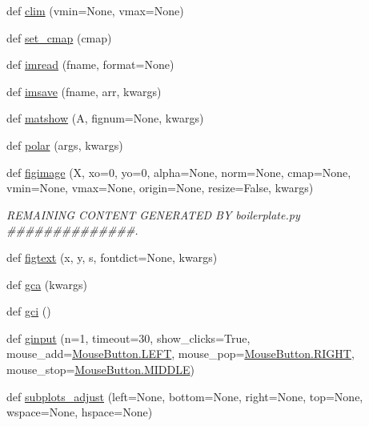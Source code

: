 \begin{DoxyCompactItemize}
def \hyperlink{namespacematplotlib_1_1pyplot_a413472148a3c1f5a2665920f297d1ff5}{clim} (vmin=None, vmax=None)
\item 
def \hyperlink{namespacematplotlib_1_1pyplot_a804514d96fdf423c2bbcb435bab08bd4}{set\+\_\+cmap} (cmap)
\item 
def \hyperlink{namespacematplotlib_1_1pyplot_a7deadbf80afd785a9ef5b2128e292541}{imread} (fname, format=None)
\item 
def \hyperlink{namespacematplotlib_1_1pyplot_abdaa34f18b9c0dbfc8fe5fc205f534cb}{imsave} (fname, arr, kwargs)
\item 
def \hyperlink{namespacematplotlib_1_1pyplot_a96bbaba88a450c5cc69c5585d0de5ae6}{matshow} (A, fignum=None, kwargs)
\item 
def \hyperlink{namespacematplotlib_1_1pyplot_a61f89e91655ed628a676ff105a030142}{polar} (args, kwargs)
\item 
def \hyperlink{namespacematplotlib_1_1pyplot_ac063c7afc5dc35f98c550f42f90da996}{figimage} (X, xo=0, yo=0, alpha=None, norm=None, cmap=None, vmin=None, vmax=None, origin=None, resize=False, kwargs)
\begin{DoxyCompactList}\small\item\em R\+E\+M\+A\+I\+N\+I\+NG C\+O\+N\+T\+E\+NT G\+E\+N\+E\+R\+A\+T\+ED BY boilerplate.\+py \#\#\#\#\#\#\#\#\#\#\#\#\#\#. \end{DoxyCompactList}\item 
def \hyperlink{namespacematplotlib_1_1pyplot_a868f2a8d6e864b41f32a29be3c19ce1e}{figtext} (x, y, s, fontdict=None, kwargs)
\item 
def \hyperlink{namespacematplotlib_1_1pyplot_a5caf006dd7ad1b34c5b806459a2ed19e}{gca} (kwargs)
\item 
def \hyperlink{namespacematplotlib_1_1pyplot_a07302c3a1b7a35a9a5e46c48b92d9012}{gci} ()
\item 
def \hyperlink{namespacematplotlib_1_1pyplot_a71d7a13e292f554fbed54305ab7495c7}{ginput} (n=1, timeout=30, show\+\_\+clicks=True, mouse\+\_\+add=\hyperlink{classmatplotlib_1_1backend__bases_1_1MouseButton_ae8e233d820706cbadfe957ae465eeb95}{Mouse\+Button.\+L\+E\+FT}, mouse\+\_\+pop=\hyperlink{classmatplotlib_1_1backend__bases_1_1MouseButton_a978a5d3296f60f59521a4e671cada7c8}{Mouse\+Button.\+R\+I\+G\+HT}, mouse\+\_\+stop=\hyperlink{classmatplotlib_1_1backend__bases_1_1MouseButton_ae501ff34ab8b37895cebc5046cc651a7}{Mouse\+Button.\+M\+I\+D\+D\+LE})
\item 
def \hyperlink{namespacematplotlib_1_1pyplot_a01f04495b119a5ef40533adca5a17d29}{subplots\+\_\+adjust} (left=None, bottom=None, right=None, top=None, wspace=None, hspace=None)

\end{DoxyCompactItemize}
